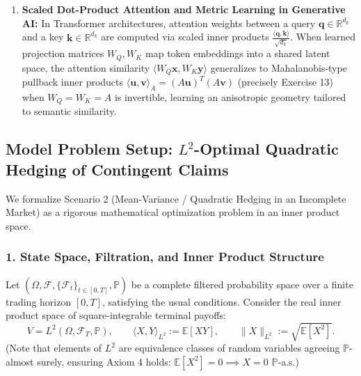 \documentclass[11pt, letterpaper]{article}
\theoremstyle{definition}
\theoremstyle{remark}
\begin{document}
\begin{enumerate}
    \item \textbf{Scaled Dot-Product Attention and Metric Learning in Generative AI:}
    In Transformer architectures, attention weights between a query $\mathbf{q} \in \mathbb{R}^{d_k}$ and a key $\mathbf{k} \in \mathbb{R}^{d_k}$ are computed via scaled inner products $\frac{\langle \mathbf{q}, \mathbf{k} \rangle}{\sqrt{d_k}}$. When learned projection matrices $W_Q, W_K$ map token embeddings into a shared latent space, the attention similarity $\langle W_Q \mathbf{x}, W_K \mathbf{y} \rangle$ generalizes to Mahalanobis-type pullback inner products $\langle \mathbf{u}, \mathbf{v} \rangle_A = (A\mathbf{u})^T(A\mathbf{v})$ (precisely Exercise 13) when $W_Q = W_K = A$ is invertible, learning an anisotropic geometry tailored to semantic similarity.
\end{enumerate}

\subsection{Model Problem Setup: $L^2$-Optimal Quadratic Hedging of Contingent Claims}

We formalize Scenario 2 (Mean-Variance / Quadratic Hedging in an Incomplete Market) as a rigorous mathematical optimization problem in an inner product space.

\subsubsection*{1. State Space, Filtration, and Inner Product Structure}
Let $(\Omega, \mathcal{F}, \{\mathcal{F}_t\}_{t \in [0, T]}, \mathbb{P})$ be a complete filtered probability space over a finite trading horizon $[0, T]$, satisfying the usual conditions. Consider the real inner product space of square-integrable terminal payoffs:
\[
    V = L^2(\Omega, \mathcal{F}_T, \mathbb{P}), \qquad \langle X, Y \rangle_{L^2} := \mathbb{E}[XY], \qquad \|X\|_{L^2} := \sqrt{\mathbb{E}[X^2]}.
\]
(Note that elements of $L^2$ are equivalence classes of random variables agreeing $\mathbb{P}$-almost surely, ensuring Axiom 4 holds: $\mathbb{E}[X^2] = 0 \implies X = 0$ $\mathbb{P}$-a.s.)
\end{document}
